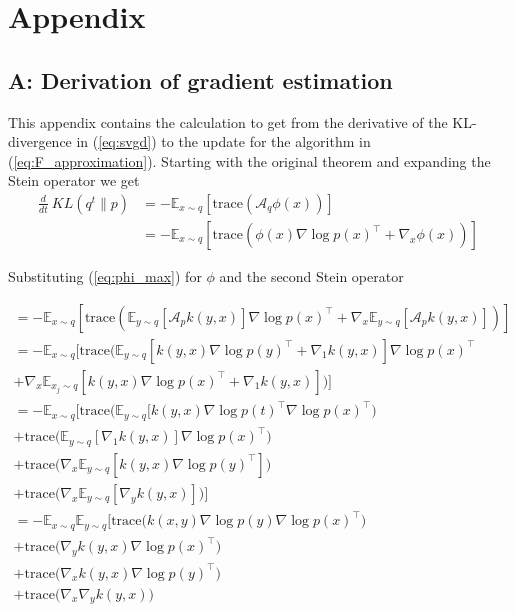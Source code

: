 \documentclass{article}
\begin{document}
\section{Appendix}
\subsection{A: Derivation of gradient estimation}
This appendix contains the calculation to get from the derivative of the KL-divergence in (\ref{eq:svgd})
to the update for the algorithm in (\ref{eq:F_approximation}).
Starting with the original theorem and expanding the Stein operator we get
\begin{align}
    \frac{d}{dt}\ KL( q^t \| p ) &= - \mathbb{E}_{x \sim q} \left[ \text{trace} \left( \mathcal{A}_q \phi(x) \right) \right] \\
         &=  - \mathbb{E}_{x \sim q} \left[ 
             \text{trace} \left( \phi(x) \nabla \log p(x)^\top  + \nabla_x \phi(x) \right)
         \right]\
\end{align}

Substituting (\ref{eq:phi_max}) for $\phi$ and the second Stein operator

\begin{gather}
         =  - \mathbb{E}_{x \sim q} \left[ 
                 \text{trace} \left( \mathbb{E}_{y \sim q} \left[ \mathcal{A}_p k(y,x) \right] \nabla \log p(x)^\top
                        + \nabla_x \mathbb{E}_{y \sim q } \left[ \mathcal{A}_p k(y, x) \right] \right) 
                \right] \\
        =  - \mathbb{E}_{x \sim q} \Big[ 
                     \text{trace}  \Big(
                      \mathbb{E}_{y\sim q} \left[ k(y,x) \nabla \log p(y)^\top 
                      + \nabla_{1} k(y,x) \right] \nabla \log p(x)^\top \\
               + \nabla_x \mathbb{E}_{x_j \sim q } \left[ 
                          k(y,x) \nabla \log p(x)^\top 
                          + \nabla_{1} k(y,x)
                      \right] 
              \Big) \Big] \\
        = - \mathbb{E}_{x \sim q} \Big[ 
             \text{trace} \Big( \mathbb{E}_{y \sim q} [ k(y,x) \nabla \log p(t)^\top \nabla \log p(x)^\top \Big) \\
             + \text{trace} \Big( \mathbb{E}_{y \sim q} [ \nabla_{1}  k(y,x) ] \nabla \log p(x)^\top \Big) \\
             + \text{trace} \Big( \nabla_x \mathbb{E}_{y \sim q} [ k(y,x) \nabla  \log p(y)^\top ] \Big) \\
             + \text{trace} \Big( \nabla_x \mathbb{E}_{y \sim q} [ \nabla_y  k(y,x)] \Big)
             \Big] \\
         = - \mathbb{E}_{x \sim q} \mathbb{E}_{y \sim q} \Big[
             \text{trace} \Big( k(x,y) \nabla \log p(y) \nabla \log p(x)^\top \Big) \\
             + \text{trace} \Big( \nabla_y  k(y,x) \nabla \log p(x)^\top \Big) \\
             + \text{trace} \Big( \nabla_x k(y,x) \nabla  \log p(y)^\top \Big) \\
             + \text{trace} \Big( \nabla_x \nabla_y  k(y,x) \Big) 
\end{gather}
\end{document}

